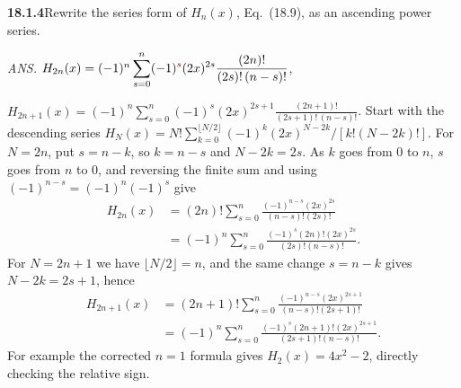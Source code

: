 \par\bigskip
\noindent\textbf{18.1.4}\quad Rewrite the series form of $H_{n}(x)$,
Eq.~(18.9), as an ascending power series.
\par\nobreak\hfill\emph{ANS.}\enspace
$H_{2n}(x)=(-1)^{n}\displaystyle\sum_{s=0}^{n}
(-1)^{\erratum{s}}(2x)^{2s}\frac{(2n)!}{(2s)!\,(n-s)!}$,\par\nobreak
\hfill$H_{2n+1}(x)=(-1)^{n}\displaystyle\sum_{s=0}^{n}
(-1)^{s}(2x)^{2s+1}\frac{(2n+1)!}{(2s+1)!\,(n-s)!}$.
\solution
Start with the descending series
$H_N(x)=N!\sum_{k=0}^{\lfloor N/2\rfloor}
(-1)^k(2x)^{N-2k}/[k!(N-2k)!]$.
For $N=2n$, put $s=n-k$, so $k=n-s$ and $N-2k=2s$.  As $k$ goes from
$0$ to $n$, $s$ goes from $n$ to $0$, and reversing the finite sum and
using $(-1)^{n-s}=(-1)^n(-1)^s$ give
\begin{align*}
H_{2n}(x)
 &=(2n)!\sum_{s=0}^n
 \frac{(-1)^{n-s}(2x)^{2s}}{(n-s)!(2s)!}\\
 &=\boxed{(-1)^n\sum_{s=0}^n
 \frac{(-1)^s(2n)!(2x)^{2s}}{(2s)!(n-s)!}}.
\end{align*}
For $N=2n+1$ we have $\lfloor N/2\rfloor=n$, and the same change
$s=n-k$ gives $N-2k=2s+1$, hence
\begin{align*}
H_{2n+1}(x)
 &=(2n+1)!\sum_{s=0}^n
 \frac{(-1)^{n-s}(2x)^{2s+1}}{(n-s)!(2s+1)!}\\
 &=\boxed{(-1)^n\sum_{s=0}^n
 \frac{(-1)^s(2n+1)!(2x)^{2s+1}}{(2s+1)!(n-s)!}}.
\end{align*}
  For example the corrected $n=1$ formula gives
$H_2(x)=4x^2-2$, directly checking the relative sign.

